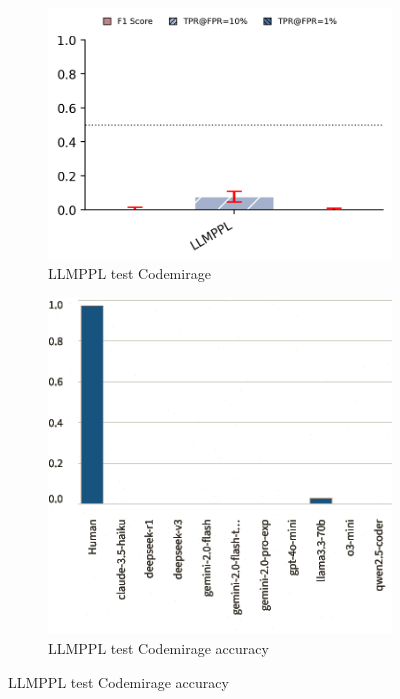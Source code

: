 \begin{figure}[H]
    \centering
    \begin{subfigure}[b]{0.45\textwidth}
        \centering
        \includegraphics[width=\linewidth]{img/TEST/LLMPPL/UncoveringTest.png}
        \caption{LLMPPL test Codemirage}
        \label{fig:6}
    \end{subfigure}
    \hfill
    \begin{subfigure}[t]{0.45\textwidth}
        \centering
        \includegraphics[width=\linewidth]{img/TEST/LLMPPL/visualization(34).png}
        \caption{LLMPPL test Codemirage accuracy}
        \label{fig:b6}
    \end{subfigure}
\end{figure}


